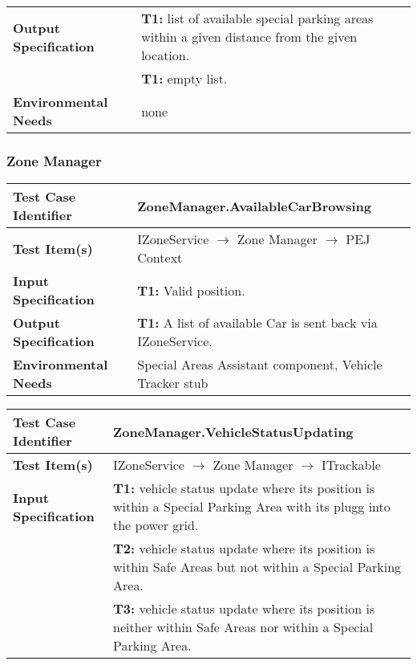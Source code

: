 {\begin{tabularx}{\textwidth}{l X}
    \textbf{Output Specification} & \textbf{T1:} list of available special parking areas within a given distance from the given location.\\
                                & \textbf{T1:} empty list.\\
    \hline 
    
    \textbf{Environmental Needs} & none\\
    \hline
\end{tabularx}

\noindent 
\subsubsection{Zone Manager}
\begin{tabularx}{\textwidth}{l X}
    \hline 
    \textbf{Test Case Identifier} & ZoneManager.AvailableCarBrowsing\\ 
    \hline 
    
    \textbf{Test Item(s)} & IZoneService $\rightarrow$ Zone Manager $\rightarrow$ PEJ Context\\
    \hline 
    
    \textbf{Input Specification} & \textbf{T1:} Valid position.\\
    \hline 
    
    \textbf{Output Specification} & \textbf{T1:} A list of available Car is sent back via IZoneService.\\
                                
    \hline 
    
    \textbf{Environmental Needs} & Special Areas Assistant component, Vehicle Tracker stub\\
    \hline
\end{tabularx}
\bigskip 

\noindent 
\begin{tabularx}{\textwidth}{l X}
    \hline 
    \textbf{Test Case Identifier} & ZoneManager.VehicleStatusUpdating\\ 
    \hline 
    
    \textbf{Test Item(s)} & IZoneService $\rightarrow$ Zone Manager $\rightarrow$ ITrackable\\ %
    \hline 
    
    \textbf{Input Specification} & \textbf{T1:} vehicle status update where its position is within a Special Parking Area with its plugg into the power grid.\\
                                & \textbf{T2:} vehicle status update where its position is within Safe Areas but not within a Special Parking Area.\\
                                & \textbf{T3:} vehicle status update where its position is neither within Safe Areas nor within a Special Parking Area.\\
    \hline 
    

\end{tabularx}}
